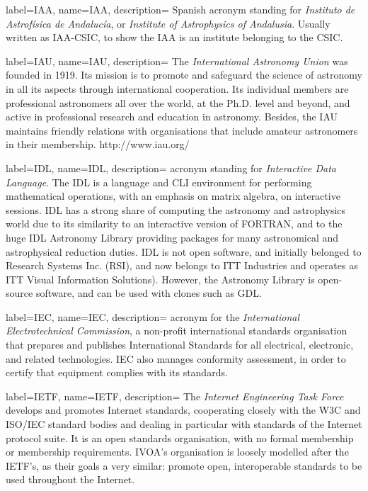 {
    label={IAA},
    name={IAA},
    description={
    	Spanish acronym standing for \emph{Instituto de Astrofísica de
        Andalucía}, or \emph{Institute of Astrophysics of Andalusia}.
        Usually written as IAA-CSIC, to show the IAA is an institute
        belonging to the \gls{CSIC}.
    }
}

{
    label={IAU},
    name={IAU},
    description={
    	The \emph{International Astronomy Union} was founded in 1919.
        Its mission is to promote and safeguard the science of
        astronomy in all its aspects through international cooperation.
        Its individual members are professional astronomers all over
        the world, at the Ph.D. level and beyond, and active in
        professional research and education in astronomy. Besides, the
        IAU maintains friendly relations with organisations that
        include amateur astronomers in their membership.
        http://www.iau.org/
    }
}

{
    label={IDL},
    name={IDL},
    description={
    	acronym standing for \emph{Interactive Data Language}. The IDL
        is a language and \gls{CLI} environment for performing
        mathematical operations, with an emphasis on matrix algebra, on
        \gls{interactive sessions}. IDL has a strong share of computing
        the astronomy and astrophysics world due to its similarity to
        an interactive version of FORTRAN, and to the huge \gls{IDL
        Astronomy Library} providing packages for many astronomical and
        astrophysical \gls{reduction} duties. IDL is not open software,
        and initially belonged to Research Systems Inc. (RSI), and now
        belongs to ITT Industries and operates as ITT Visual
        Information Solutions). However, the Astronomy Library is
        \gls{open-source} software, and can be used with clones such as
        \gls{GDL}.
    }
}

{
    label={IEC},
    name={IEC},
    description={
    	acronym for the \emph{International Electrotechnical
        Commission}, a non-profit international standards organisation
        that prepares and publishes International Standards for all
        electrical, electronic, and related technologies. IEC also
        manages conformity assessment, in order to certify that
        equipment complies with its standards.
    }
}

{
    label={IETF},
    name={IETF},
    description={
    	The \emph{Internet Engineering Task Force} develops and
        promotes Internet standards, cooperating closely with the
        \gls{W3C} and \gls{ISO}/\gls{IEC} standard bodies and dealing
        in particular with standards of the \gls{Internet}
        \gls{protocol suite}. It is an open standards organisation,
        with no formal membership or membership requirements.
        \gls{IVOA}'s organisation is loosely modelled after the IETF's,
        as their goals a very similar: promote open, interoperable
        standards to be used throughout the Internet.
    }
}

